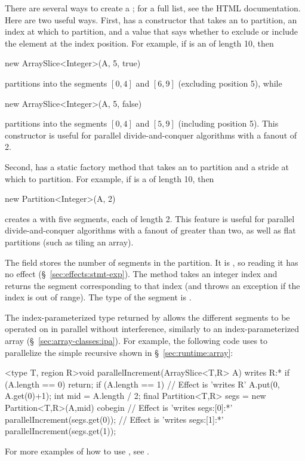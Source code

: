  There are several ways to
create a ; for a full list, see the HTML
documentation.  Here are two useful ways.  First, 
has a constructor that takes an  to partition, an index
at which to partition, and a  value that says whether to
exclude or include the element at the index position.  For example, if
 is an  of length 10, then
%
\begin{dpjlisting}
new ArraySlice<Integer>(A, 5, true)
\end{dpjlisting}
%
partitions  into the segments $[0,4]$ and $[6,9]$ (excluding
position 5), while
%
\begin{dpjlisting}
new ArraySlice<Integer>(A, 5, false)
\end{dpjlisting}
%
partitions  into the segments $[0,4]$ and $[5,9]$ (including
position 5).  This constructor is useful for parallel
divide-and-conquer algorithms with a fanout of 2.

Second,  has a static factory method
 that takes an  to partition and a
stride at which to partition.  For example, if  is a
 of length 10, then
%
\begin{dpjlisting}
new Partition<Integer>(A, 2)
\end{dpjlisting}
%
creates a  with five segments, each of
length 2.  This feature is useful for parallel divide-and-conquer
algorithms with a fanout of greater than two, as well as flat
partitions (such as tiling an array).

 The field  stores the number
of segments in the partition.  It is , so reading it has no
effect (\S~\ref{sec:effects:stmt-exp}).  The method  takes an
integer index  and returns the segment corresponding to that
index (and throws an exception if the index is out of range).  The
type of the segment is .

The index-parameterized type returned by  allows the
different segments to be operated on in parallel without interference,
similarly to an index-parameterized array
(\S~\ref{sec:array-classes:ipa}).  For example, the following code uses
 to parallelize the simple recursive 
shown in \S~\ref{sec:runtime:array}:
%
\begin{dpjlisting}
<type T, region R>void parallelIncrement(ArraySlice<T,R> A) 
  writes R:* 
{
  if (A.length == 0) return;
  if (A.length == 1) {
    // Effect is 'writes R'
    A.put(0, A.get(0)+1);
  }
  int mid = A.length / 2;
  final Partition<T,R> segs = new Partition<T,R>(A,mid)
  cobegin {
    // Effect is 'writes segs:[0]:*'
    parallelIncrement(segs.get(0));
    // Effect is 'writes segs:[1]:*'
    parallelIncrement(segs.get(1));
  }
}
\end{dpjlisting}
%
For more examples of how to use , see \tutorial.

